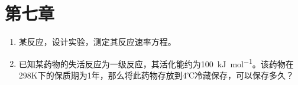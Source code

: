 \documentclass[cn,blue,14pt,normal]{elegantnote}
\begin{document}
\bigskip

\bigskip



\newpage
\section*{第七章}

\begin{enumerate}
  \item 某反应，设计实验，测定其反应速率方程。
  \item 已知某药物的失活反应为一级反应，其活化能约为\SI{100}{kJ.mol^{-1}}。该药物在298K下的保质期为1年，那么将此药物存放到4℃冷藏保存，可以保存多久？
\end{enumerate}
\end{document}
